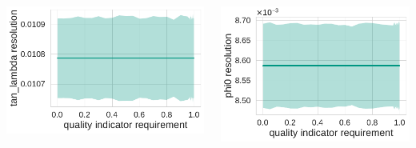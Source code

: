 \documentclass[18pt, aspectratio=169]{beamer}
\begin{document}
\begin{frame}
\begin{columns}
\begin{column}{.33\textwidth}
    \end{column}
  \end{columns}
  \begin{columns}
    \begin{column}{.33\textwidth}
      \centering
      \includegraphics[width=\textwidth]{figures/combined-qi/tan_lambda_resolution.pdf}
    \end{column}
    \begin{column}{.33\textwidth}
      \centering
      \includegraphics[width=\textwidth]{figures/combined-qi/phi0_resolution.pdf}
    \end{column}
  \end{columns}
\end{frame}
\end{document}
